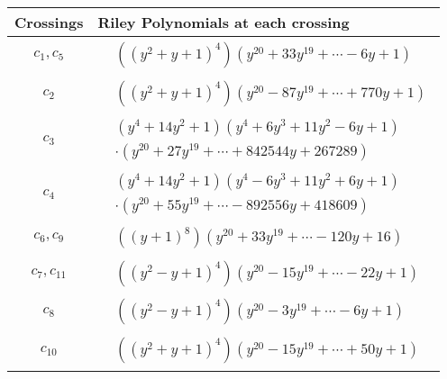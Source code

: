 \documentclass[1p]{elsarticle_modified}
\theoremstyle{definition}
\begin{document}
\begin{tabular}{m{50pt}|m{274pt}}
Crossings & \hspace{64pt}Riley Polynomials at each crossing \\
\hline $$\begin{aligned}c_{1},c_{5}\end{aligned}$$&$\begin{aligned}
&((y^2+y+1)^4)(y^{20}+33 y^{19}+\cdots-6 y+1)
\end{aligned}$\\
\hline $$\begin{aligned}c_{2}\end{aligned}$$&$\begin{aligned}
&((y^2+y+1)^4)(y^{20}-87 y^{19}+\cdots+770 y+1)
\end{aligned}$\\
\hline $$\begin{aligned}c_{3}\end{aligned}$$&$\begin{aligned}
&(y^4+14 y^2+1)(y^4+6 y^3+11 y^2-6 y+1)\\
&\cdot(y^{20}+27 y^{19}+\cdots+842544 y+267289)
\end{aligned}$\\
\hline $$\begin{aligned}c_{4}\end{aligned}$$&$\begin{aligned}
&(y^4+14 y^2+1)(y^4-6 y^3+11 y^2+6 y+1)\\
&\cdot(y^{20}+55 y^{19}+\cdots-892556 y+418609)
\end{aligned}$\\
\hline $$\begin{aligned}c_{6},c_{9}\end{aligned}$$&$\begin{aligned}
&((y+1)^8)(y^{20}+33 y^{19}+\cdots-120 y+16)
\end{aligned}$\\
\hline $$\begin{aligned}c_{7},c_{11}\end{aligned}$$&$\begin{aligned}
&((y^2- y+1)^4)(y^{20}-15 y^{19}+\cdots-22 y+1)
\end{aligned}$\\
\hline $$\begin{aligned}c_{8}\end{aligned}$$&$\begin{aligned}
&((y^2- y+1)^4)(y^{20}-3 y^{19}+\cdots-6 y+1)
\end{aligned}$\\
\hline $$\begin{aligned}c_{10}\end{aligned}$$&$\begin{aligned}
&((y^2+y+1)^4)(y^{20}-15 y^{19}+\cdots+50 y+1)
\end{aligned}$\\
\hline
\end{tabular}
\vskip 2pc
\end{document}
